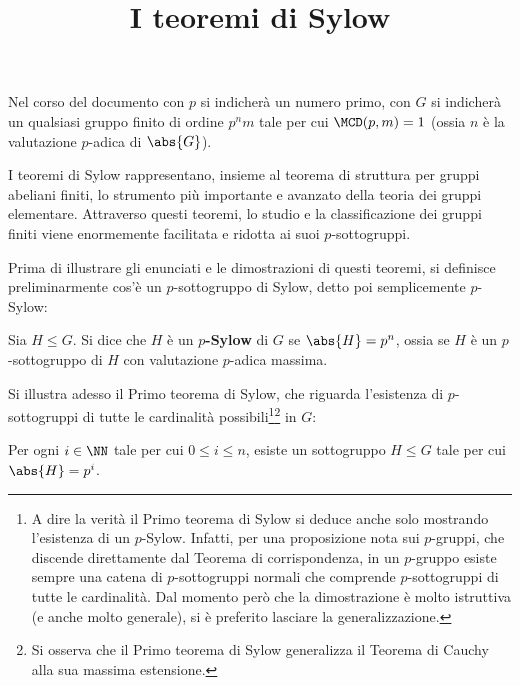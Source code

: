 \documentclass[12pt]{scrartcl}
\begin{document}
	\title{I teoremi di Sylow}
	\maketitle
	
	\begin{note}
		Nel corso del documento con $p$ si indicherà un numero
		primo, con $G$ si indicherà un qualsiasi gruppo finito di ordine $p^n m$ tale per cui $\MCD(p, m) = 1$
		(ossia $n$ è la valutazione $p$-adica di $\abs{G}$).
	\end{note}

	I teoremi di Sylow rappresentano, insieme al teorema di
	struttura per gruppi abeliani finiti, lo strumento più
	importante e avanzato della teoria dei gruppi elementare.
	Attraverso questi teoremi, lo studio e la classificazione dei
	gruppi finiti viene enormemente facilitata e ridotta ai suoi
	$p$-sottogruppi. \medskip
	
	
	Prima di illustrare gli enunciati e le dimostrazioni di questi
	teoremi, si definisce preliminarmente cos'è un $p$-sottogruppo
	di Sylow, detto poi semplicemente $p$-Sylow:
	
	\begin{definition}[$p$-Sylow]
		Sia $H \leq G$. Si dice che $H$ è un \textbf{$p$-Sylow}
		di $G$ se $\abs{H} = p^n$, ossia se $H$ è un $p$-sottogruppo
		di $H$ con valutazione $p$-adica massima.
	\end{definition}
	
	Si illustra adesso il Primo teorema di Sylow, che riguarda
	l'esistenza di $p$-sottogruppi di tutte le cardinalità
	possibili\footnote{
		A dire la verità il Primo teorema di Sylow si deduce
		anche solo mostrando l'esistenza di un $p$-Sylow. Infatti,
		per una proposizione nota sui $p$-gruppi, che discende
		direttamente dal Teorema di corrispondenza, in un
		$p$-gruppo esiste sempre
		una catena di $p$-sottogruppi normali che comprende
		$p$-sottogruppi di tutte le cardinalità. Dal momento
		però che la dimostrazione è molto istruttiva (e anche
		molto generale), si è preferito lasciare la generalizzazione.
	}\footnote{
		Si osserva che il Primo teorema di Sylow generalizza il
		Teorema di Cauchy alla sua massima estensione.
	} in $G$:
	
	\begin{theorem}
		Per ogni $i \in \NN$ tale per cui $0 \leq i \leq n$, esiste
		un sottogruppo $H \leq G$ tale per cui $\abs{H} = p^i$.
	\end{theorem}
\end{document}
